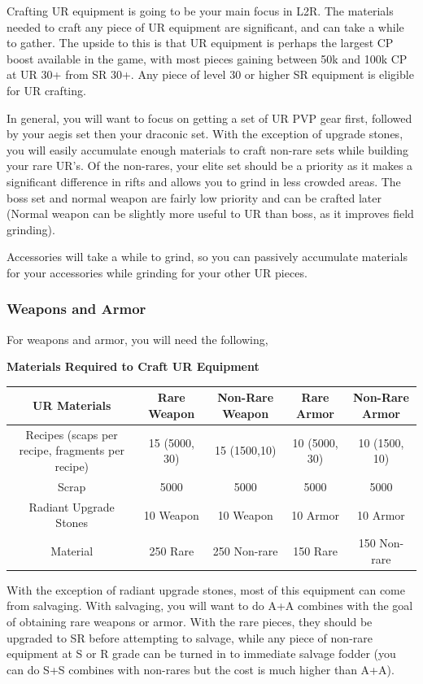 \documentclass[]{article}
\begin{document}
Crafting UR equipment is going to be your main focus in L2R.
The materials needed to craft any piece of UR equipment are significant, and can take a while to gather.
The upside to this is that UR equipment is perhaps the largest CP boost available in the game, with most pieces gaining between 50k and 100k CP at UR 30+ from SR 30+.
Any piece of level 30 or higher SR equipment is eligible for UR crafting.

In general, you will want to focus on getting a set of UR PVP gear first, followed by your aegis set then your draconic set.
With the exception of upgrade stones, you will easily accumulate enough materials to craft non-rare sets while building your rare UR's.
Of the non-rares, your elite set should be a priority as it makes a significant difference in rifts and allows you to grind in less crowded areas.
The boss set and normal weapon are fairly low priority and can be crafted later (Normal weapon can be slightly more useful to UR than boss, as it improves field grinding).

Accessories will take a while to grind, so you can passively accumulate materials for your accessories while grinding for your other UR pieces.

\subsubsection{Weapons and Armor}

For weapons and armor, you will need the following,\\
\begin{center}
	\textbf{Materials Required to Craft UR Equipment}\\
	\begin{tabular}{|c|c|c|c|c|}
		\hline 
		UR Materials & Rare Weapon & Non-Rare Weapon & Rare Armor & Non-Rare Armor \\ 
		\hline 
		Recipes (scaps per recipe, fragments per recipe) & 15 (5000, 30) & 15 (1500,10) & 10 (5000, 30) & 10 (1500, 10) \\ 
		Scrap & 5000 & 5000 & 5000 & 5000 \\ 
		Radiant Upgrade Stones & 10 Weapon & 10 Weapon & 10 Armor & 10 Armor \\ 
		Material & 250 Rare & 250 Non-rare & 150 Rare & 150 Non-rare \\ 
		\hline 
	\end{tabular} 
\end{center}

With the exception of radiant upgrade stones, most of this equipment can come from salvaging.
With salvaging, you will want to do A+A combines with the goal of obtaining rare weapons or armor.
With the rare pieces, they should be upgraded to SR before attempting to salvage, while any piece of non-rare equipment at S or R grade can be turned in to immediate salvage fodder (you can do S+S combines with non-rares but the cost is much higher than A+A).
\end{document}
